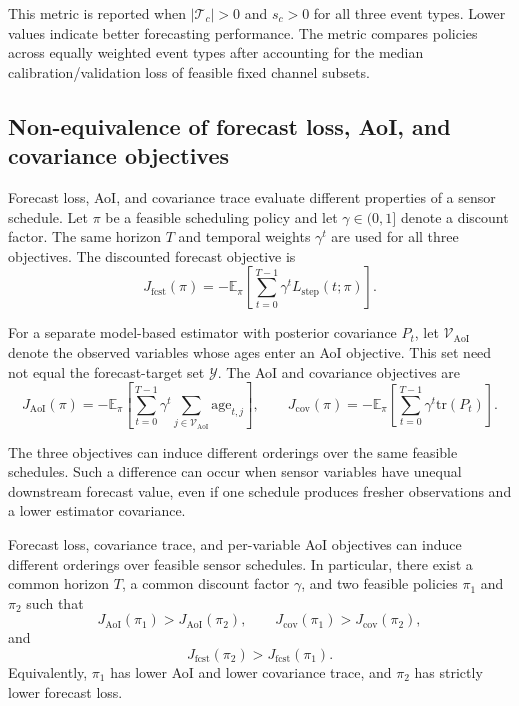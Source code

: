 This metric is reported when $|\mathcal{T}_c|>0$ and $s_c>0$ for all three
event types. Lower values indicate better forecasting performance. The metric
compares policies across equally weighted event types after accounting for the
median calibration/validation loss of feasible fixed channel subsets.

\subsection{Non-equivalence of forecast loss, AoI, and covariance objectives}

Forecast loss, AoI, and covariance trace evaluate different properties of a
sensor schedule. Let $\pi$ be a feasible scheduling policy and let
$\gamma\in(0,1]$ denote a discount factor. The same horizon $T$ and temporal
weights $\gamma^t$ are used for all three objectives. The discounted forecast objective is
\begin{equation}
  J_{\mathrm{fcst}}(\pi)
  =
  -\mathbb{E}_{\pi}
  \left[
    \sum_{t=0}^{T-1}\gamma^t
    L_{\mathrm{step}}(t;\pi)
  \right].
  \label{eq:forecast_objective}
\end{equation}

For a separate model-based estimator with posterior covariance $P_t$, let
$\mathcal{V}_{\mathrm{AoI}}$ denote the observed variables whose ages enter an
AoI objective. This set need not equal the forecast-target set $\mathcal{Y}$.
The AoI and covariance objectives are
\begin{equation}
  J_{\mathrm{AoI}}(\pi)
  =
  -\mathbb{E}_{\pi}\!\left[
    \sum_{t=0}^{T-1}\gamma^t
    \sum_{j\in\mathcal{V}_{\mathrm{AoI}}}\mathrm{age}_{t,j}
  \right],
  \qquad
  J_{\mathrm{cov}}(\pi)
  =
  -\mathbb{E}_{\pi}\!\left[
    \sum_{t=0}^{T-1}\gamma^t
    \mathrm{tr}(P_t)
  \right].
\end{equation}

The three objectives can induce different orderings over the same feasible
schedules. Such a difference can occur when sensor variables have unequal
downstream forecast value, even if one schedule produces fresher observations
and a lower estimator covariance.

\begin{proposition}
\label{prop:non_equivalence}
Forecast loss, covariance trace, and per-variable AoI objectives can induce
different orderings over feasible sensor schedules. In particular, there exist
a common horizon $T$, a common discount factor $\gamma$, and two feasible
policies $\pi_1$ and $\pi_2$ such that
\begin{equation}
  J_{\mathrm{AoI}}(\pi_1) > J_{\mathrm{AoI}}(\pi_2),
  \qquad
  J_{\mathrm{cov}}(\pi_1) > J_{\mathrm{cov}}(\pi_2),
\end{equation}
and
\begin{equation}
  J_{\mathrm{fcst}}(\pi_2) > J_{\mathrm{fcst}}(\pi_1).
\end{equation}
Equivalently, $\pi_1$ has lower AoI and lower covariance trace, and
$\pi_2$ has strictly lower forecast loss.
\end{proposition}

